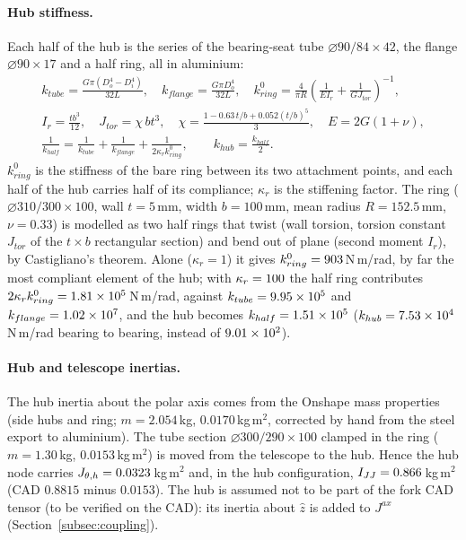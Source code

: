 \documentclass[10pt,a4paper]{article}
\numberwithin{equation}{section}
\begin{document}
\paragraph{Hub stiffness.} Each half of the hub is the series of the bearing-seat tube $\varnothing90/84\times42$, the flange $\varnothing90\times17$ and a half ring, all in aluminium:
\begin{gather}
k_{tube} = \frac{G\pi(D_o^4 - D_i^4)}{32L},\quad k_{flange} = \frac{G\pi D_o^4}{32L},\quad k_{ring}^{0} = \frac{4}{\pi R}\left(\frac{1}{EI_r} + \frac{1}{GJ_{tor}}\right)^{-1},\\
I_r = \frac{t b^3}{12},\quad J_{tor} = \chi\, b t^3,\quad \chi = \frac{1 - 0.63\,t/b + 0.052(t/b)^5}{3},\quad E = 2G(1+\nu),\\
\frac{1}{k_{half}} = \frac{1}{k_{tube}} + \frac{1}{k_{flange}} + \frac{1}{2\kappa_r k_{ring}^{0}},\qquad k_{hub} = \frac{k_{half}}{2}.
\end{gather}
$k_{ring}^{0}$ is the stiffness of the bare ring between its two attachment points, and each half of the hub carries half of its compliance; $\kappa_r$ is the stiffening factor. The ring ($\varnothing310/300\times100$, wall $t = 5$\,mm, width $b = 100$\,mm, mean radius $R = 152.5$\,mm, $\nu = 0.33$) is modelled as two half rings that twist (wall torsion, torsion constant $J_{tor}$ of the $t\times b$ rectangular section) and bend out of plane (second moment $I_r$), by Castigliano's theorem. Alone ($\kappa_r = 1$) it gives $k_{ring}^{0} = 903$\,N\,m/rad, by far the most compliant element of the hub; with $\kappa_r = 100$ the half ring contributes $2\kappa_r k_{ring}^{0} = 1.81\times10^{5}$\,N\,m/rad, against $k_{tube} = 9.95\times10^{5}$ and $k_{flange} = 1.02\times10^{7}$, and the hub becomes $k_{half} = 1.51\times10^{5}$ ($k_{hub} = 7.53\times10^{4}$\,N\,m/rad bearing to bearing, instead of $9.01\times10^{2}$).
\paragraph{Hub and telescope inertias.} The hub inertia about the polar axis comes from the Onshape mass properties (side hubs and ring; $m = 2.054$\,kg, $0.0170$\,kg\,m$^2$, corrected by hand from the steel export to aluminium). The tube section $\varnothing300/290\times100$ clamped in the ring ($m = 1.30$\,kg, $0.0153$\,kg\,m$^2$) is moved from the telescope to the hub. Hence the hub node carries $J_{\theta,h} = 0.0323$\,kg\,m$^2$ and, in the hub configuration, $I_{JJ} = 0.866$\,kg\,m$^2$ (CAD $0.8815$ minus $0.0153$). The hub is assumed not to be part of the fork CAD tensor (to be verified on the CAD): its inertia about $\hat z$ is added to $J^{ax}$ (Section~\ref{subsec:coupling}).
\end{document}

